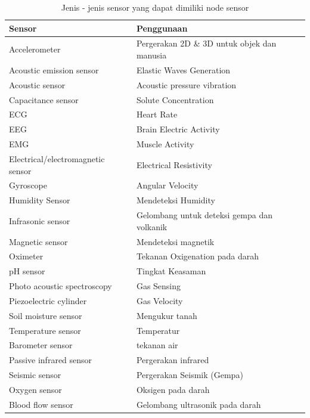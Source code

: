 \begin{table} [H]
	\centering 
	\caption{Jenis - jenis sensor yang dapat dimiliki node sensor}
	\label{tab:sensor}
	\begin{tabular}{|p{6cm}|p{9cm}|}
		\toprule
		Sensor & Penggunaan\\

		\midrule
		Accelerometer & Pergerakan 2D \& 3D untuk objek dan manusia  \\
		Acoustic emission sensor & Elastic Waves Generation\\
		Acoustic sensor   & Acoustic pressure vibration\\
		Capacitance sensor  & Solute Concentration\\
		ECG   & Heart Rate\\
		EEG  & Brain Electric Activity\\
		EMG   & Muscle Activity\\
		Electrical/electromagnetic sensor & Electrical Resistivity\\
		Gyroscope  & Angular Velocity \\
		Humidity Sensor   & Mendeteksi Humidity\\
		Infrasonic sensor  &  Gelombang untuk deteksi gempa dan volkanik\\
		Magnetic sensor   & Mendeteksi magnetik\\
		Oximeter   & Tekanan Oxigenation pada darah  \\
		pH sensor  & Tingkat Keasaman\\
		Photo acoustic spectroscopy   & Gas Sensing\\
		Piezoelectric cylinder    &  Gas Velocity\\
		Soil moisture sensor   &  Mengukur tanah\\
		Temperature sensor   & Temperatur \\
		Barometer sensor  &  tekanan air\\
		Passive infrared sensor  & Pergerakan infrared\\
		Seismic sensor   & Pergerakan Seismik (Gempa) \\
		Oxygen sensor  & Oksigen pada darah \\
		Blood flow sensor  & Gelombang ultrasonik pada darah \\

		\bottomrule
		
	\end{tabular} 
\end{table}

